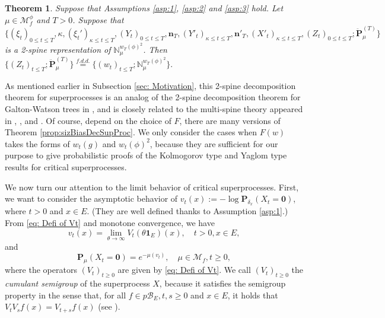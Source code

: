 \documentclass[UTF8]{pkuthss}
\theoremstyle{plain}
\newtheorem{thm}{Theorem}[section]
\theoremstyle{definition}
\numberwithin{equation}{section}
\begin{document}
\begin{thm}\label{prop:2-spine-decomposition}
	Suppose that Assumptions \ref{asp:1}, \ref{asp:2} and \ref{asp:3} hold.
	Let $\mu\in\mathcal M_f^\phi$ and $T>0$.
	Suppose that
$
	\{(\xi_t)_{0\leq t\leq T}, \kappa, (\xi_t')_{\kappa\leq t\leq T}, (Y_t)_{0\leq t\leq T}, \mathbf n_T,(Y'_t)_{\kappa \leq t\leq T}, \mathbf n'_T, (
	X'_t)_{\kappa \leq t\leq T}, (Z_t)_{0\leq t\leq T} ; \ddot {\mathbf P}_\mu^{(T)}\}
$
	is a 2-spine representation of $\mathbb N_\mu^{w_T(\phi)^2}$.
	Then
$
	\{(Z_t)_{t\leq T}; \ddot {\mathbf P}^{(T)}_\mu\}
	\overset{f.d.d.}{=} \{(w_t)_{t\leq T}; \mathbb N^{w_T(\phi)^2}_\mu\}.
$
\end{thm}
As mentioned earlier in Subsection \ref{sec: Motivation},
	this 2-spine decomposition theorem for superprocesses is an analog of the 2-spine decomposition theorem for Galton-Watson trees in \cite{RenSongSun2018A-2-spine}, and is closely related to the multi-spine theory appeared in  \cite{HarrisRoberts2017The-many-to-few}, \cite{HarrisJohnstonRoberts2017The-coalescent}, \cite{Johnston2017Coalescence} and \cite{AbrahamDebs2018Penalization}.
Of course, depend on the choice of $F$, there are many versions of Theorem \ref{prop:sizBiasDecSupProc}.
	We only consider the cases when $F(w)$ takes the forms of $w_t(g)$ and $w_t(\phi)^2$, because they are sufficient for our purpose to give probabilistic proofs of the Kolmogorov type and Yaglom type results for critical superprocesses.

	We now turn our attention to the limit behavior of critical superprocesses. First, we want to consider the asymptotic behavior of $v_t(x):= - \log \mathbf P_{\delta_x}(X_t = \mathbf 0)$, where $t>0$ and $x\in E$. (They are well defined thanks to Assumption \ref{asp:1}.)
	From \eqref{eq: Defi of Vt} and monotone convergence, we have
\begin{equation}
\label{eq: defi of vt}
	v_t(x) = \lim_{\theta \to \infty}V_t(\theta \mathbf 1_E)(x),
	\quad t> 0, x\in E,
\end{equation}
and
\begin{equation}\label{eq: extinction probability with vt}
	\mathbf P_{\mu}(X_t = \mathbf 0) = e^{- \mu(v_t) },
	\quad \mu \in \mathcal M_f, t\geq 0,
\end{equation}
 where the operators $(V_t)_{t\geq 0}$ are given by \eqref{eq: Defi of Vt}.
	We call $(V_t)_{t \geq 0}$ the \emph{cumulant semigroup} of the superprocess $X$, because it satisfies the semigroup property in the sense that, for all $f\in p\mathscr B_E, t, s \geq 0$ and $x \in E$, it holds that $V_t V_sf(x) = V_{t+s} f(x)$ (see \cite[Theorem 2.21]{Li2011Measure-valued}).
\end{document}
